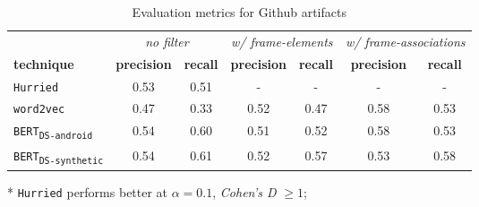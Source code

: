 \begin{table}[H]
\centering    
\begin{small}
\begin{threeparttable}
\begin{tabular}{lcccccc}


& \multicolumn{2}{c}{\textit{no filter}} 
& \multicolumn{2}{c}{\textit{w/ frame-elements}}
& \multicolumn{2}{c}{\textit{w/ frame-associations}}

\\ \cmidrule(l){2-3} \cmidrule(l){4-5} \cmidrule(l){6-7} 


\textbf{technique} & 
\textbf{precision} & \textbf{recall} &
\textbf{precision} & \textbf{recall} &
\textbf{precision} & \textbf{recall} \\ 


\hline


\texttt{Hurried} &
0.53 & 0.51 &
- & - &
- & -
\\

\texttt{word2vec} &
0.47 & 0.33\tnote{*} &
0.52 & 0.47 &
0.58 &  0.53 
\\


\texttt{BERT\textsubscript{DS-android}} &
0.54 & 0.60 &
0.51 & 0.52 &
0.58 & 0.53 
\\


\texttt{BERT\textsubscript{DS-synthetic}} &
0.54 & 0.61 &
0.52 & 0.57 &
0.53 & 0.58 
\\



\hline

\end{tabular}
\begin{tablenotes}
    \item[*] \texttt{Hurried} performs better at $\alpha = 0.1$, \textit{Cohen's D} $\ge 1$;
\end{tablenotes}
\end{threeparttable}
\end{small}
\caption{Evaluation metrics for Github artifacts}
\label{tbl:techniques-results-github}
\end{table}

